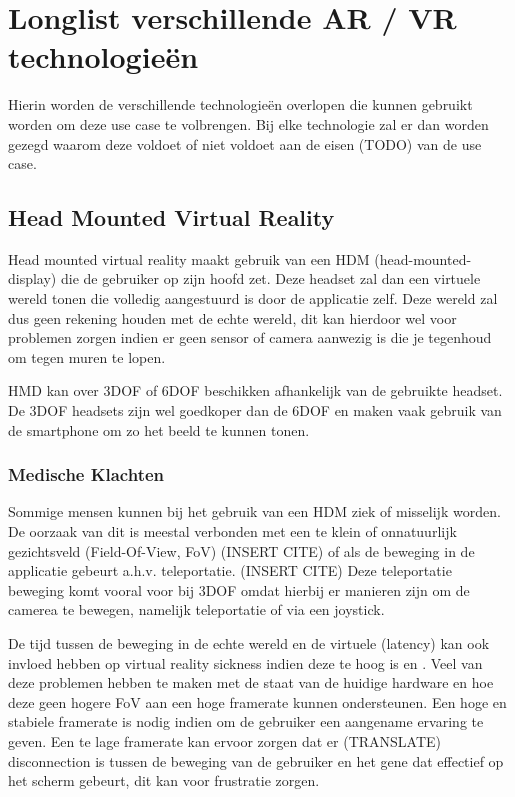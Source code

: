 \chapter{Longlist verschillende AR / VR technologieën}
\label{ch:longlist}

Hierin worden de verschillende technologieën overlopen die kunnen gebruikt worden om deze use case te volbrengen.
Bij elke technologie zal er dan worden gezegd waarom deze voldoet of niet voldoet aan de eisen (TODO) van de use case.

\section{Head Mounted Virtual Reality}
Head mounted virtual reality maakt gebruik van een HDM (head-mounted-display) die de gebruiker op zijn hoofd zet. Deze headset zal dan een virtuele wereld tonen die volledig aangestuurd is door de applicatie zelf. Deze wereld zal dus geen rekening houden met de echte wereld, dit kan hierdoor wel voor problemen zorgen indien er geen sensor of camera aanwezig is die je tegenhoud om tegen muren te lopen.

HMD kan over 3DOF of 6DOF beschikken afhankelijk van de gebruikte headset. De 3DOF headsets zijn wel goedkoper dan de 6DOF en maken vaak gebruik van de smartphone om zo het beeld te kunnen tonen. 
\subsection{Medische Klachten}
Sommige mensen kunnen bij het gebruik van een HDM ziek of misselijk worden. De oorzaak van dit is meestal verbonden met een te klein of onnatuurlijk gezichtsveld (Field-Of-View, FoV) (INSERT CITE) of als de beweging in de applicatie gebeurt a.h.v. teleportatie. (INSERT CITE) Deze teleportatie beweging komt vooral voor bij 3DOF omdat hierbij er manieren zijn om de camerea te bewegen, namelijk teleportatie of via een joystick.

De tijd tussen de beweging in de echte wereld en de virtuele (latency) kan ook invloed hebben op virtual reality sickness indien deze te hoog is \autocite{Elbamby2018} en \autocite{DiZio2000}. 
Veel van deze problemen hebben te maken met de staat van de huidige hardware en hoe deze geen hogere FoV aan een hoge framerate kunnen ondersteunen. Een hoge en stabiele framerate is nodig indien om de gebruiker een aangename ervaring te geven. Een te lage framerate kan ervoor zorgen dat er (TRANSLATE) disconnection is tussen de beweging van de gebruiker en het gene dat effectief op het scherm gebeurt, dit kan voor frustratie zorgen.
